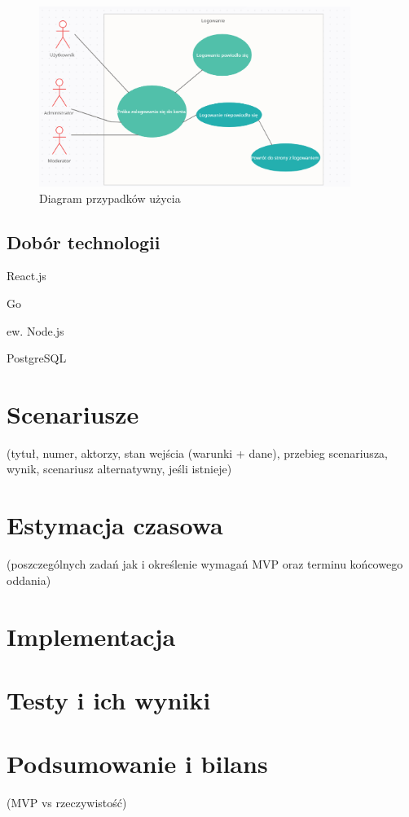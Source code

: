 \documentclass[12pt,a4paper]{article}
\begin{document}
\begin{figure}[htb!p]
  \includegraphics[width=0.9\textwidth]{rys/dpu.png}
  \caption{Diagram przypadków użycia}
  \label{dpu}
  \end{figure}
\subsection{Dobór technologii}

React.js

Go

ew. Node.js

PostgreSQL

\newpage

\section{Scenariusze}
(tytuł, numer, aktorzy, stan wejścia (warunki + dane), przebieg scenariusza, wynik, scenariusz alternatywny, jeśli istnieje)

\newpage

\section{Estymacja czasowa }
(poszczególnych zadań jak i określenie wymagań MVP oraz terminu końcowego oddania)
\section{Implementacja}
\section{Testy i ich wyniki}
\section{Podsumowanie i bilans}
(MVP vs rzeczywistość)
\newpage
\end{document}

